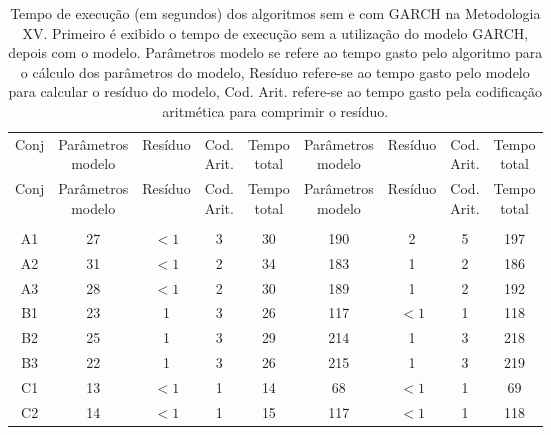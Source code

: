 \begin{center}
\begin{longtable}{ccccc|cccc}
\toprule
\rowcolor{white}
\caption[Metodologia XV: tempo de execução]{Tempo de execução (em segundos)
dos algoritmos sem e com GARCH na Metodologia XV. Primeiro é exibido o tempo de
execução sem a utilização do modelo GARCH, depois com o modelo. Parâmetros
modelo se refere ao tempo gasto pelo algoritmo para o cálculo dos parâmetros do
modelo, Resíduo refere-se ao tempo gasto pelo modelo para calcular o resíduo do
modelo, Cod. Arit. refere-se ao tempo gasto pela codificação aritmética para
comprimir o resíduo.} \label{tab:EvolucaoEntropiaMet15}\\
\midrule
Conj & \specialcell{Parâmetros\\modelo} &
Resíduo & \specialcell{Cod.\\Arit.} & \specialcell{Tempo\\total} &
\specialcell{Parâmetros\\modelo} &
Resíduo & \specialcell{Cod.\\Arit.} & \specialcell{Tempo\\total} \\
\midrule
\endfirsthead 
\midrule
\rowcolor{white}
Conj & \specialcell{Parâmetros\\modelo} &
Resíduo & \specialcell{Cod.\\Arit.} & \specialcell{Tempo\\total} &
\specialcell{Parâmetros\\modelo} &
Resíduo & \specialcell{Cod.\\Arit.} & \specialcell{Tempo\\total} \\
\toprule
\endhead
\midrule \\ %
\endfoot
\bottomrule 
\endlastfoot
A1&27&$<1$&3&30&190&2&5&197\\
A2&31&$<1$&2&34&183&1&2&186\\
A3&28&$<1$&2&30&189&1&2&192\\
B1&23&1&3&26&117&$<1$&1&118\\
B2&25&1&3&29&214&1&3&218\\
B3&22&1&3&26&215&1&3&219\\
C1&13&$<1$&1&14&68&$<1$&1&69\\
C2&14&$<1$&1&15&117&$<1$&1&118\\

\end{longtable}
\end{center}
